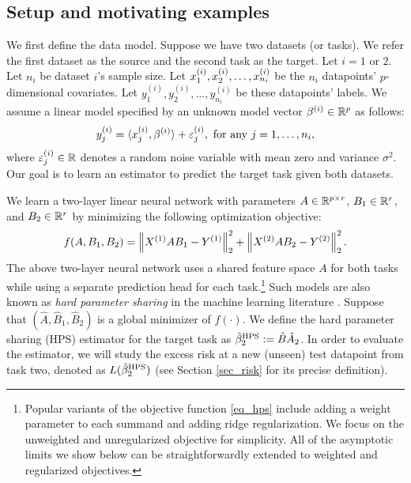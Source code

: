 \subsection{Setup and motivating examples}\label{sec_mot}

We first define the data model.
Suppose we have two datasets (or tasks).
We refer the first dataset as the source and the second task as the target.
Let $i = 1$ or $2$.
Let $n_i$ be dataset $i$'s sample size.
Let $x_1^{(i)}, x_2^{\ss (i)}, \dots, x_{n_i}^{(i)}$ be the $n_i$ datapoints' $p$-dimensional covariates.
Let $y_1^{(i)}, y_2^{(i)}, \dots, y_{n_i}^{(i)}$ be these datapoints' labels.
We assume a linear model specified by an unknown model vector $\beta^{(i)} \in \real^p$ as follows:
\begin{align}
    y_j^{(i)} = \inner{x_j^{(i)}}{\beta^{(i)}} + \varepsilon_j^{(i)}, \text{ for any } j = 1,\dots,n_i, \label{eq_linear}
\end{align}
where $\varepsilon^{(i)}_j\in\real$ denotes a random noise variable with mean zero and variance $\sigma^2$.
Our goal is to learn an estimator to predict the target task given both datasets.

We learn a two-layer linear neural network with parameters $A \in \real^{p\times r}$, $B_1 \in \real^{r}$, and $B_2 \in \real^r$ by minimizing the following optimization objective:
\begin{align}\label{eq_hps}
    f(A, B_1, B_2) = \bignorm{X^{(1)} A B_1 - Y^{(1)}}_2^2 + \bignorm{X^{(2)} A B_2 - Y^{(2)}}_2^2.
\end{align}
The above two-layer neural network uses a shared feature space $A$ for both tasks while using a separate prediction head for each task.\footnote{Popular variants of the objective function \eqref{eq_hps} include adding a weight parameter to each summand and adding ridge regularization. We focus on the unweighted and unregularized objective for simplicity. All of the asymptotic limits we show below can be straightforwardly extended to weighted and regularized objectives.}
Such models are also known as \textit{hard parameter sharing} in the machine learning literature \cite{C97,R17}.
Suppose that $(\hat{A}, \hat{B}_1, \hat{B}_2)$ is a global minimizer of $f(\cdot)$.
We define the hard parameter sharing (HPS) estimator for the target task as $\hat{\beta}_2^{\MTL} \define \hat{B} \hat{A}_2$.
In order to evaluate the estimator, we will study the excess risk at a new (unseen) test datapoint from task two, denoted as $L(\hat{\beta}_2^{\MTL})$ (see Section \ref{sec_risk} for its precise definition).

